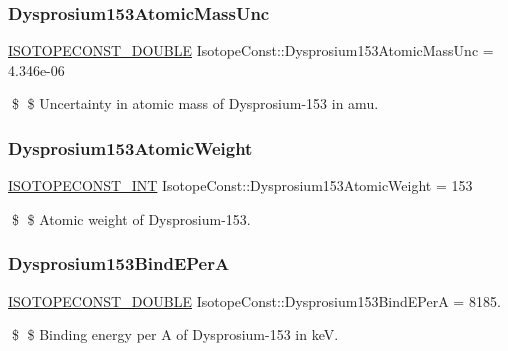 \subsubsection{\texorpdfstring{Dysprosium153\+Atomic\+Mass\+Unc}{Dysprosium153AtomicMassUnc}}
{\footnotesize\ttfamily \mbox{\hyperlink{group___isotope_const-_macros_ga8f45a7272ce02c0b4c65c44636ed719a}{I\+S\+O\+T\+O\+P\+E\+C\+O\+N\+S\+T\+\_\+\+D\+O\+U\+B\+LE}} Isotope\+Const\+::\+Dysprosium153\+Atomic\+Mass\+Unc = 4.\+346e-\/06}

\$ \$ Uncertainty in atomic mass of Dysprosium-\/153 in amu. \mbox{\label{group___isotope_const-_dysprosium-_dy153_ga8248e1ec3d6ac380fcad549ad5c2b17a}} 
\subsubsection{\texorpdfstring{Dysprosium153\+Atomic\+Weight}{Dysprosium153AtomicWeight}}
{\footnotesize\ttfamily \mbox{\hyperlink{group___isotope_const-_macros_ga5f18360b3e99483a35c32d789e62621c}{I\+S\+O\+T\+O\+P\+E\+C\+O\+N\+S\+T\+\_\+\+I\+NT}} Isotope\+Const\+::\+Dysprosium153\+Atomic\+Weight = 153}

\$ \$ Atomic weight of Dysprosium-\/153. \mbox{\label{group___isotope_const-_dysprosium-_dy153_ga83eb3fa173644387f04bfa0e08a9f98d}} 
\subsubsection{\texorpdfstring{Dysprosium153\+Bind\+E\+PerA}{Dysprosium153BindEPerA}}
{\footnotesize\ttfamily \mbox{\hyperlink{group___isotope_const-_macros_ga8f45a7272ce02c0b4c65c44636ed719a}{I\+S\+O\+T\+O\+P\+E\+C\+O\+N\+S\+T\+\_\+\+D\+O\+U\+B\+LE}} Isotope\+Const\+::\+Dysprosium153\+Bind\+E\+PerA = 8185.}

\$ \$ Binding energy per A of Dysprosium-\/153 in keV. \mbox{\label{group___isotope_const-_dysprosium-_dy153_ga733e143b21ff21b3966c438ec93a827c}} 
